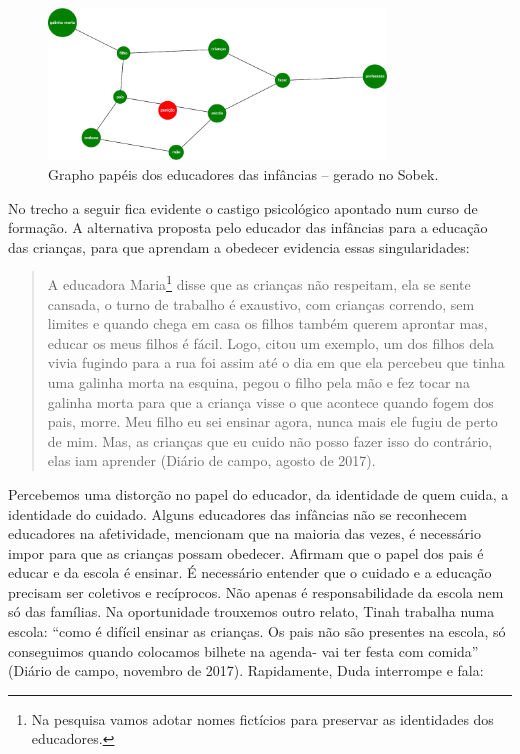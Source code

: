 \documentclass{textolivre}
\begin{document}
\begin{figure}[h!]
 \centering
 \includegraphics[width=0.8\textwidth]{figure08.png}
 \caption{Grapho papéis dos educadores das infâncias -- gerado no Sobek.}
 \label{fig-fig08}
\end{figure}


No trecho a seguir fica evidente o castigo psicológico apontado num curso de formação. A alternativa proposta pelo educador das infâncias para a educação das crianças, para que aprendam a obedecer evidencia essas singularidades:

\begin{quote}
A educadora Maria\footnote{Na pesquisa vamos adotar nomes fictícios para preservar as identidades dos educadores.} disse que as crianças não respeitam, ela se sente cansada, o turno de trabalho é exaustivo, com crianças correndo, sem limites e quando chega em casa os filhos também querem aprontar mas, educar os meus filhos é fácil. Logo, citou um exemplo, um dos filhos dela vivia fugindo para a rua foi assim até o dia em que ela percebeu que tinha uma galinha morta na esquina, pegou o filho pela mão e fez tocar na galinha morta para que a criança visse o que acontece quando fogem dos pais, morre. Meu filho eu sei ensinar agora, nunca mais ele fugiu de perto de mim. Mas, as crianças que eu cuido não posso fazer isso do contrário, elas iam aprender (Diário de campo, agosto de 2017). 
\end{quote}

Percebemos uma distorção no papel do educador, da identidade de quem cuida, a identidade do cuidado. Alguns educadores das infâncias não se reconhecem educadores na afetividade, mencionam que na maioria das vezes, é necessário impor para que as crianças possam obedecer. Afirmam que o papel dos pais é educar e da escola é ensinar. É necessário entender que o cuidado e a educação precisam ser coletivos e recíprocos. Não apenas é responsabilidade da escola nem só das famílias. Na oportunidade trouxemos outro relato, Tinah trabalha numa escola: “como é difícil ensinar as crianças. Os pais não são presentes na escola, só conseguimos quando colocamos bilhete na agenda- vai ter festa com comida” (Diário de campo, novembro de 2017). Rapidamente, Duda interrompe e fala:
\end{document}
